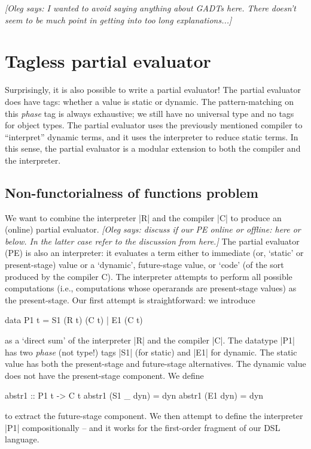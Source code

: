 \documentclass[preprint]{sigplanconf}
\newcommand{\oleg}[1]{{\it [Oleg says: #1]}}
\begin{document}
\oleg{I wanted to avoid saying anything about GADTs here. There
  doesn't seem to be much point in getting into too long
  explanations...}



\section{Tagless partial evaluator}\label{PE}

Surprisingly, it is also possible to write a partial evaluator!  The
partial evaluator does have tags: whether a value is static or dynamic.
The pattern-matching on this \emph{phase} tag is always exhaustive; we still
have no universal type and no tags for object types.  The partial
evaluator uses the previously mentioned compiler to ``interpret'' dynamic
terms, and it uses the interpreter to reduce static terms.  In this sense, 
the partial evaluator is a modular extension to both the compiler and
the interpreter. 

\subsection{Non-functorialness of functions problem}
\label{S:PE-problem}
We want to combine the interpreter |R| and the compiler |C| to produce
an (online) partial evaluator. \oleg{discuss if our PE online or
  offline: here or below. In the latter case refer to the discussion
  from here.} The partial evaluator (PE) is also an interpreter: it
evaluates a term either to immediate (or, `static' or present-stage)
value or a `dynamic', future-stage value, or `code' (of the sort
produced by the compiler C). The interpreter attempts to perform all
possible computations (i.e., computations whose operarands are
present-stage values) as the present-stage. Our first attempt is
straightforward: we introduce
\begin{code}
data P1 t = S1 (R t) (C t) | E1 (C t)
\end{code}
as a `direct sum' of the interpreter |R| and the compiler |C|. The
datatype |P1| has two \emph{phase} (not type!) tags |S1| 
(for static) and |E1| for dynamic. The static value has both the
present-stage and future-stage alternatives. The dynamic value does
not have the present-stage component. We define
\begin{code}
abstr1 :: P1 t -> C t
abstr1 (S1 _ dyn) = dyn
abstr1 (E1 dyn)   = dyn
\end{code}
to extract the future-stage component. We then attempt to define the
interpreter |P1| compositionally -- and it works for the first-order
fragment of our DSL language.
\end{document}
